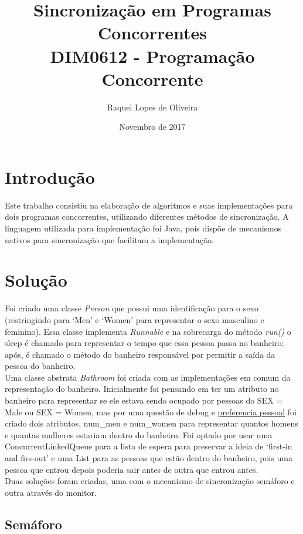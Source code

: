 \documentclass{article}
\title{Sincronização em Programas Concorrentes\\ \large DIM0612 - Programação Concorrente}
\author{Raquel Lopes de Oliveira}
\date{Novembro de 2017}
\newcommand\tab[1][1cm]{\hspace*{#1}}
\begin{document}
\maketitle

\section*{Introdução}
\tab Este trabalho consistiu na elaboração de algoritmos e suas implementações para dois programas concorrentes, utilizando diferentes métodos de sincronização.\hfill \break
\tab A linguagem utilizada para implementação foi Java, pois dispõe de mecanismos nativos para sincronização que facilitam a implementação.

\section*{Solução}
\tab Foi criado uma classe \textit{Person} que possui uma identificação para o sexo (restringindo para `Men' e `Women' para representar o sexo masculino e feminino). Essa classe implementa \textit{Runnable} e na sobrecarga do método \textit{run()} o sleep é chamado para representar o tempo que essa pessoa passa no banheiro; após, é chamado o método do banheiro responsável por permitir a saída da pessoa do banheiro.\\
\tab Uma classe abstrata \textit{Bathroom} foi criada com as implementações em comum da representação do banheiro. Inicialmente foi pensando em ter um atributo no banheiro para representar se ele estava sendo ocupado por pessoas do SEX = Male ou SEX = Women, mas por uma questão de debug e \underline{preferencia pessoal} foi criado dois atributos, num\_men e num\_women para representar quantos homens e quantas mulheres estariam dentro do banheiro. Foi optado por usar uma ConcurrentLinkedQueue para a lista de espera para preservar a ideia de `first-in and firs-out' e uma List para as pessoas que estão dentro do banheiro, pois uma pessoa que entrou depois poderia sair antes de outra que entrou antes.\\

\tab Duas soluções foram criadas, uma com o mecanismo de sincronização semáforo e outra através do monitor.

\subsection*{Semáforo}
\end{document}
